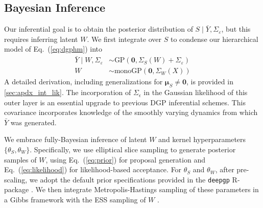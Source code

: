 \documentclass[11pt]{article}
\begin{document}
\subsection{Bayesian Inference}\label{sec:inference}

Our inferential goal is to obtain the posterior distribution of 
$S\mid\bar{Y},\Sigma_\varepsilon$, but this requires inferring latent $W$.  
We first integrate over $S$ to condense our hierarchical model of Eq.~(\ref{eq:dgphm}) into
\begin{align}
\label{eq:likelihood}
\bar{Y} \mid W, \Sigma_\varepsilon &\sim \textrm{GP}(\mathbf{0}, \Sigma_S(W) + \Sigma_\varepsilon) \\
\label{eq:prior}
W &\sim \mathrm{monoGP}\left(\mathbf{0}, \Sigma_W(X)\right)
\end{align}
A detailed derivation, including generalizations for 
$\boldsymbol{\mu}_S\neq\mathbf{0}$, is provided in \ref{sec:apdx_int_lik}. 
The incorporation of $\Sigma_\epsilon$ in the
Gaussian likelihood of this outer layer is an essential upgrade to previous DGP inferential schemes.
This covariance incorporates knowledge of the smoothly varying dynamics from which $\bar{Y}$ was
generated.

We embrace fully-Bayesian inference of latent $W$ and kernel hyperparameters $\{\theta_S, \theta_W\}$.
Specifically, we use elliptical slice sampling \citep[ESS;][]{murray2010elliptical} to 
generate posterior samples of $W$, using Eq.~(\ref{eq:prior}) for proposal generation and 
Eq.~(\ref{eq:likelihood}) for likelihood-based acceptance.  
For $\theta_S$ and $\theta_W$, after pre-scaling, we adopt the default prior specifications 
provided in the {\tt deepgp} {\sf R}-package \citep{deepgp}.
We then integrate Metropolis-Hastings sampling of these parameters in a Gibbs framework 
with the ESS sampling of $W$ \citep{sauer2023active}.
\end{document}
